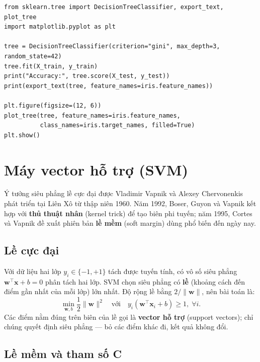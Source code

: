 \begin{lstlisting}[caption={Cây quyết định và trực quan hóa}]
from sklearn.tree import DecisionTreeClassifier, export_text, plot_tree
import matplotlib.pyplot as plt

tree = DecisionTreeClassifier(criterion="gini", max_depth=3, random_state=42)
tree.fit(X_train, y_train)
print("Accuracy:", tree.score(X_test, y_test))
print(export_text(tree, feature_names=iris.feature_names))

plt.figure(figsize=(12, 6))
plot_tree(tree, feature_names=iris.feature_names,
          class_names=iris.target_names, filled=True)
plt.show()
\end{lstlisting}


\section{Máy vector hỗ trợ (SVM)}

Ý tưởng siêu phẳng lề cực đại được Vladimir Vapnik và Alexey Chervonenkis phát triển tại Liên Xô từ thập niên 1960. Năm 1992, Boser, Guyon và Vapnik kết hợp với \textbf{thủ thuật nhân} (kernel trick) để tạo biên phi tuyến; năm 1995, Cortes và Vapnik đề xuất phiên bản \textbf{lề mềm} (soft margin) dùng phổ biến đến ngày nay.

\subsection{Lề cực đại}

Với dữ liệu hai lớp $y_i \in \{-1, +1\}$ tách được tuyến tính, có vô số siêu phẳng $\mathbf{w}^\top\mathbf{x} + b = 0$ phân tách hai lớp. SVM chọn siêu phẳng có \textbf{lề} (khoảng cách đến điểm gần nhất của mỗi lớp) lớn nhất. Độ rộng lề bằng $2/\|\mathbf{w}\|$, nên bài toán là:
\begin{equation}
    \min_{\mathbf{w}, b} \frac{1}{2}\|\mathbf{w}\|^2 \quad \text{với} \quad y_i(\mathbf{w}^\top\mathbf{x}_i + b) \geq 1, \;\forall i.
\end{equation}
Các điểm nằm đúng trên biên của lề gọi là \textbf{vector hỗ trợ} (support vectors); chỉ chúng quyết định siêu phẳng --- bỏ các điểm khác đi, kết quả không đổi.

\subsection{Lề mềm và tham số C}

